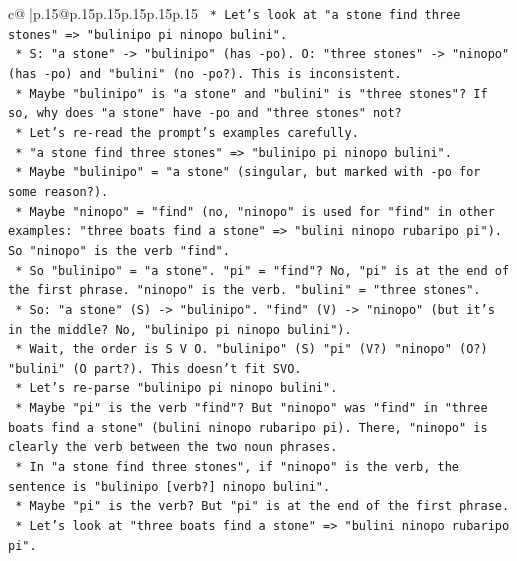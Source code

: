 \documentclass{article}
\begin{document}
{\begin{supertabular}{c@{$\;$}|p{.15\linewidth}@{}p{.15\linewidth}p{.15\linewidth}p{.15\linewidth}p{.15\linewidth}p{.15\linewidth}}
{{{\texttt{        *   Let's look at "a stone find three stones" => "bulinipo pi ninopo bulini".} \\
\texttt{            *   S: "a stone" {-}> "bulinipo" (has {-}po). O: "three stones" {-}> "ninopo" (has {-}po) and "bulini" (no {-}po?). This is inconsistent.} \\
\texttt{            *   Maybe "bulinipo" is "a stone" and "bulini" is "three stones"? If so, why does "a stone" have {-}po and "three stones" not?} \\
\texttt{            *   Let's re{-}read the prompt's examples carefully.} \\
\texttt{            *   "a stone find three stones" => "bulinipo pi ninopo bulini".} \\
\texttt{                *   Maybe "bulinipo" = "a stone" (singular, but marked with {-}po for some reason?).} \\
\texttt{                *   Maybe "ninopo" = "find" (no, "ninopo" is used for "find" in other examples: "three boats find a stone" => "bulini ninopo rubaripo pi"). So "ninopo" is the verb "find".} \\
\texttt{                *   So "bulinipo" = "a stone". "pi" = "find"? No, "pi" is at the end of the first phrase. "ninopo" is the verb. "bulini" = "three stones".} \\
\texttt{                *   So: "a stone" (S) {-}> "bulinipo". "find" (V) {-}> "ninopo" (but it's in the middle? No, "bulinipo pi ninopo bulini").} \\
\texttt{                *   Wait, the order is S V O. "bulinipo" (S) "pi" (V?) "ninopo" (O?) "bulini" (O part?). This doesn't fit SVO.} \\
\texttt{                *   Let's re{-}parse "bulinipo pi ninopo bulini".} \\
\texttt{                    *   Maybe "pi" is the verb "find"? But "ninopo" was "find" in "three boats find a stone" (bulini ninopo rubaripo pi). There, "ninopo" is clearly the verb between the two noun phrases.} \\
\texttt{                    *   In "a stone find three stones", if "ninopo" is the verb, the sentence is "bulinipo {[}verb?{]} ninopo bulini".} \\
\texttt{                    *   Maybe "pi" is the verb? But "pi" is at the end of the first phrase.} \\
\texttt{                    *   Let's look at "three boats find a stone" => "bulini ninopo rubaripo pi".} \\
}}}
\end{supertabular}}
\end{document}
